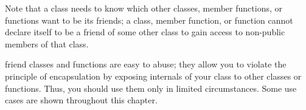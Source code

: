 Note that a class needs to know which other classes, member functions, or functions want to be its friends; a class, member function, or function cannot declare itself to be a friend of some other class to gain access to non-public members of that class.

friend classes and functions are easy to abuse; they allow you to violate the principle of encapsulation by exposing internals of your class to other classes or functions. Thus, you should use them only in limited circumstances. Some use cases are shown throughout this chapter.









